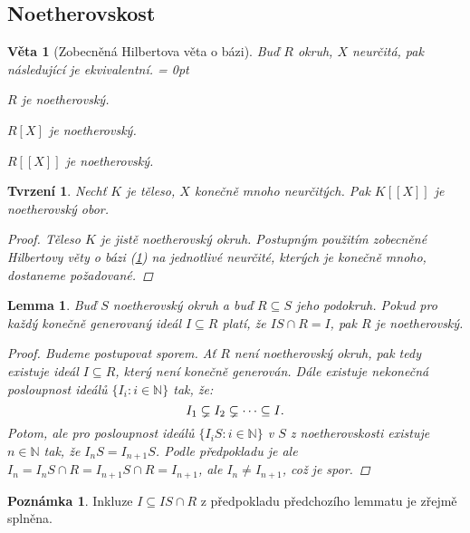\documentclass[11pt,a4paper]{article}
\newcommand\m[1]{\mathbb { #1 }} %
\newcommand\N{\m N}
\newcommand*{\ml}[1]{\[\textstyle\let\displaystyle\textstyle#1\]}	%
\newenvironment{itemsn}{%
	\enumerate%
	\itemsep = 0pt%
}{%
	\endenumerate%
}
\newcounter{numb}
\theoremstyle{definition}
\newtheorem{poznamka}[numb]{Poznámka}		%
\theoremstyle{plain}
\newtheorem{veta}[numb]{Věta}
\newtheorem{lemma}[numb]{Lemma}
\newtheorem{tvrzeni}[numb]{Tvrzení}
\begin{document}
\subsection{Noetherovskost}

\begin{veta}[Zobecněná Hilbertova věta o bázi] \label{thm:GHB}
	Buď $R$ okruh, $X$ neurčitá, pak následující je ekvivalentní.
	\begin{itemsn}
		\item $R$ je noetherovský.
		\item $R[X]$ je noetherovský.
		\item $R[[X]]$ je noetherovský.
	\end{itemsn}
\end{veta}

\begin{tvrzeni} \label{thm:KX_noe}
	Nechť $K$ je těleso, $X$ konečně mnoho neurčitých. Pak $K[[X]]$ je noetherovský obor.

	\begin{proof}
		Těleso $K$ je jistě noetherovský okruh. Postupným použitím zobecněné Hilbertovy věty o bázi (\ref{thm:GHB}) na jednotlivé neurčité, kterých je konečně mnoho, dostaneme požadované.
	\end{proof}
\end{tvrzeni}

\begin{lemma}
	Buď $S$ noetherovský okruh a buď $R \subseteq S$ jeho podokruh. Pokud pro každý konečně generovaný ideál $I \subseteq R$ platí, že $IS \cap R = I$, pak $R$ je noetherovský.

	\begin{proof}
		Budeme postupovat sporem. Ať $R$ není noetherovský okruh, pak tedy existuje ideál $I \subseteq R$, který není konečně generován. Dále existuje nekonečná posloupnost ideálů $\{I_i: i \in \N\}$ tak, že:
		\ml{
			I_1 \subsetneq I_2 \subsetneq \dots \subseteq I.
		}
		Potom, ale pro posloupnost ideálů $\{I_i S: i \in \N\}$ v $S$ z noetherovskosti existuje $n \in \N$ tak, že $I_n S = I_{n + 1} S$. Podle předpokladu je ale $I_n = I_n S \cap R = I_{n + 1} S \cap R = I_{n + 1}$, ale $I_n \not= I_{n+1}$, což je spor.
	\end{proof}
\end{lemma}

\begin{poznamka}
	Inkluze $I \subseteq IS \cap R$ z předpokladu předchozího lemmatu je zřejmě splněna.
\end{poznamka}
\end{document}
